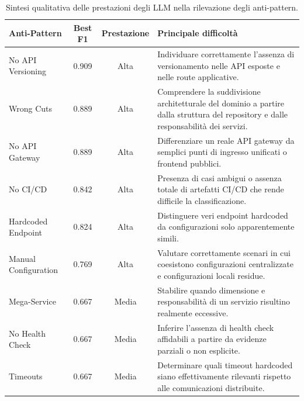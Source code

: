 \begin{table}[H]
\centering
\scriptsize
\renewcommand{\arraystretch}{1.2}
\caption{Sintesi qualitativa delle prestazioni degli LLM nella rilevazione degli anti-pattern.}
\label{tab:rq1_summary_ap}
\begin{tabular}{| >{\raggedright\arraybackslash}p{3.4cm} | c | c | >{\raggedright\arraybackslash}p{7.2cm} |}
\hline
\textbf{Anti-Pattern} & \textbf{Best F1} & \textbf{Prestazione} & \textbf{Principale difficoltà} \\ \hline

No API Versioning & 0.909 & Alta & Individuare correttamente l’assenza di versionamento nelle API esposte e nelle route applicative. \\ \hline

Wrong Cuts & 0.889 & Alta & Comprendere la suddivisione architetturale del dominio a partire dalla struttura del repository e dalle responsabilità dei servizi. \\ \hline

No API Gateway & 0.889 & Alta & Differenziare un reale API gateway da semplici punti di ingresso unificati o frontend pubblici. \\ \hline

No CI/CD & 0.842 & Alta & Presenza di casi ambigui o assenza totale di artefatti CI/CD che rende difficile la classificazione. \\ \hline

Hardcoded Endpoint & 0.824 & Alta & Distinguere veri endpoint hardcoded da configurazioni solo apparentemente simili. \\ \hline

Manual Configuration & 0.769 & Alta & Valutare correttamente scenari in cui coesistono configurazioni centralizzate e configurazioni locali residue. \\ \hline

Mega-Service & 0.667 & Media & Stabilire quando dimensione e responsabilità di un servizio risultino realmente eccessive. \\ \hline

No Health Check & 0.667 & Media & Inferire l’assenza di health check affidabili a partire da evidenze parziali o non esplicite. \\ \hline

Timeouts & 0.667 & Media & Determinare quali timeout hardcoded siano effettivamente rilevanti rispetto alle comunicazioni distribuite. \\ \hline


\end{tabular}
\end{table}
